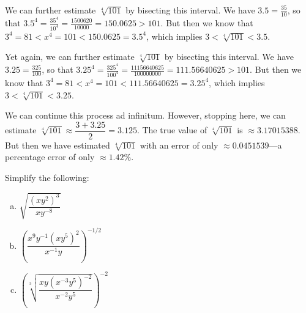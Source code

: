 \documentclass[11pt,letterpaper]{article}
\begin{document}
We can further estimate $\sqrt[4]{101}$ by bisecting this interval. We have $3.5= \frac{35}{10}$, so that $3.5^4= \frac{35^4}{10^4}= \frac{1500620}{10000}= 150.0625 > 101$. But then we know that $3^4= 81 < x^4= 101 < 150.0625= 3.5^4$, which implies $3 < \sqrt[4]{101} < 3.5$. \pspace

Yet again, we can further estimate $\sqrt[4]{101}$ by bisecting this interval. We have $3.25= \frac{325}{100}$, so that $3.25^4= \frac{325^4}{100^4}= \frac{11156640625}{100000000}= 111.56640625 > 101$. But then we know that $3^4= 81 < x^4= 101 < 111.56640625= 3.25^4$, which implies $3 < \sqrt[4]{101} < 3.25$. \pspace

We can continue this process ad infinitum. However, stopping here, we can estimate $\sqrt[4]{101} \approx \dfrac{3 + 3.25}{2}= 3.125$. The true value of $\sqrt[4]{101}$ is $\approx 3.17015388$. But then we have estimated $\sqrt[4]{101}$ with an error of only $\approx 0.0451539$---a percentage error of only $\approx 1.42\%$. 



\newpage



 Simplify the following:
	\begin{enumerate}[(a)]
	\item $\sqrt{\dfrac{(x y^2)^3}{x y^{-8}}}$
	\item $\left( \dfrac{x^9 y^{-1} (x y^5)^2}{x^{-1} y} \right)^{-1/2}$
	\item $\left( \sqrt[3]{\dfrac{xy (x^{-3} y^5)^{-2}}{x^{-2} y^5}} \right)^{-2}$
	\end{enumerate} \pspace
\end{document}
